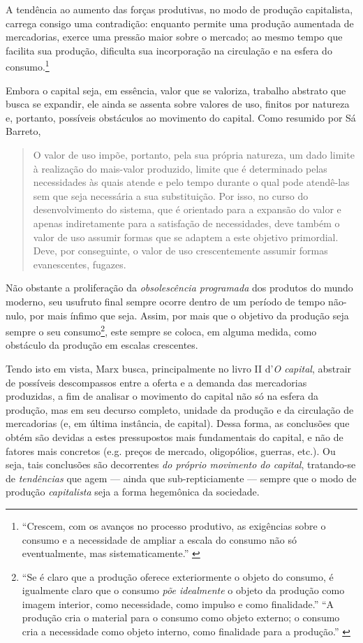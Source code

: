 A tendência ao aumento das forças produtivas, no modo de produção capitalista, carrega consigo uma contradição: enquanto permite uma produção aumentada de mercadorias, exerce uma pressão maior sobre o mercado; ao mesmo tempo que facilita sua produção, dificulta sua incorporação na circulação e na esfera do consumo.\footnote{``Crescem, com os avanços no processo produtivo, as exigências sobre o consumo e a necessidade de ampliar a escala do consumo não só eventualmente, mas sistematicamente.'' \parencite[p. 156]{SaBarreto2018}}

Embora o capital seja, em essência, valor que se valoriza, trabalho abstrato que busca se expandir, ele ainda se assenta sobre valores de uso, finitos por natureza e, portanto, possíveis obstáculos ao movimento do capital. Como resumido por Sá Barreto,
\begin{quote}
    O valor de uso impõe, portanto, pela sua própria natureza, um dado limite à realização do mais-valor produzido, limite que é determinado pelas necessidades às quais atende e pelo tempo durante o qual pode atendê-las sem que seja necessária a sua substituição. Por isso, no curso do desenvolvimento do sistema, que é orientado para a expansão do valor e apenas indiretamente para a satisfação de necessidades, deve também o valor de uso assumir formas que se adaptem a este objetivo primordial. Deve, por conseguinte, o valor de uso crescentemente assumir formas evanescentes, fugazes. \parencite[p. 157]{SaBarreto2018}
\end{quote}

Não obstante a proliferação da \textit{obsolescência programada} dos produtos do mundo moderno, seu usufruto final sempre ocorre dentro de um período de tempo não-nulo, por mais ínfimo que seja. Assim, por mais que o objetivo da produção seja sempre o seu consumo\footnote{``Se é claro que a produção oferece exteriormente o objeto do consumo, é igualmente claro que o consumo \textit{põe idealmente} o objeto da produção como imagem interior, como necessidade, como impulso e como finalidade.'' \parencite[p. 46]{Marx2011} ``A produção cria o material para o consumo como objeto externo; o consumo cria a necessidade como objeto interno, como finalidade para a produção.'' \parencite[p. 48]{Marx2011}}, este sempre se coloca, em alguma medida, como obstáculo da produção em escalas crescentes. 

Tendo isto em vista, Marx busca, principalmente no livro II d'\textit{O capital}, abstrair de possíveis descompassos entre a oferta e a demanda das mercadorias produzidas, a fim de analisar o movimento do capital não só na esfera da produção, mas em seu decurso completo, unidade da produção e da circulação de mercadorias (e, em última instância, de capital). Dessa forma, as conclusões que obtém são devidas a estes pressupostos mais fundamentais do capital, e não de fatores mais concretos (e.g. preços de mercado, oligopólios, guerras, etc.). Ou seja, tais conclusões são decorrentes \textit{do próprio movimento do capital}, tratando-se de \textit{tendências} que agem --- ainda que sub-repticiamente --- sempre que o modo de produção \textit{capitalista} seja a forma hegemônica da sociedade. 


